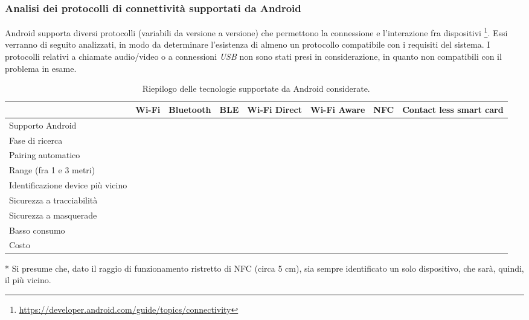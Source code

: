 \documentclass[a4paper,12pt]{report}
\newcommand{\cmark}{\ding{51}}
\newcommand{\xmark}{\ding{55}}
\begin{document}
\subsubsection{Analisi dei protocolli di connettività supportati da Android} \label{tec-android}
Android supporta diversi protocolli (variabili da versione a versione) che permettono la connessione e l'interazione fra dispositivi \footnote{\url{https://developer.android.com/guide/topics/connectivity}}. Essi verranno di seguito analizzati, in modo da determinare l'esistenza di almeno un protocollo compatibile con i requisiti del sistema. I protocolli relativi a chiamate audio/video o a connessioni \emph{USB} non sono stati presi in considerazione, in quanto non compatibili con il problema in esame.

\begin{table}[h]
	\centering
	\hspace*{-2.4cm}
	\begin{threeparttable}
		\begin{tabular}{|
				>{\centering}m{} |
				>{\centering}m{} |
				>{\centering}m{} |
				>{\centering}m{} |
				>{\centering}m{} |
				>{\centering}m{} |
				>{\centering}m{} |
				>{\centering}m{} |}
			\hline
			& Wi-Fi & Bluetooth & BLE & Wi-Fi Direct & Wi-Fi Aware & NFC & Contact less smart card \tabularnewline
			\hline
			Supporto Android & \cmark & \cmark & \cmark & \cmark & \cmark & \cmark & \cmark \tabularnewline
			\hline
			Fase di ricerca & \xmark & \cmark & \cmark & \cmark & \cmark & \cmark & \cmark \tabularnewline
			\hline
			Pairing automatico & \xmark & \xmark & \cmark & \cmark & \cmark & \cmark & \cmark \tabularnewline
			\hline
			Range (fra 1 e 3 metri) & \xmark & \xmark & \xmark & \xmark & \xmark & \xmark & \xmark \tabularnewline
			\hline
			Identificazione device più vicino & \xmark & \xmark & \xmark & \xmark & \xmark & \cmark \tnote{*} & \cmark \tnote{*} \tabularnewline
			\hline
			Sicurezza a tracciabilità & \cmark & \cmark & \cmark & \cmark & \cmark & \xmark & \cmark \tabularnewline
			\hline
			Sicurezza a masquerade & \cmark & \cmark & \cmark & \cmark & \cmark & \xmark   & \cmark \tabularnewline
			\hline
			Basso consumo & \xmark & \xmark & \cmark & \xmark & \xmark & \cmark & \cmark \tabularnewline
			\hline
			Costo & \xmark & \cmark & \cmark & \xmark & \xmark & \cmark & \xmark \tabularnewline
			\hline
		\end{tabular}
		\begin{tablenotes} \footnotesize
			\item[*] Si presume che, dato il raggio di funzionamento ristretto di NFC (circa 5 cm), sia sempre identificato un solo dispositivo, che sarà, quindi, il più vicino.
		\end{tablenotes}
		\caption{Riepilogo delle tecnologie supportate da Android considerate.}
		\label{tectable-android}
	\end{threeparttable}
\end{table}
\end{document}
